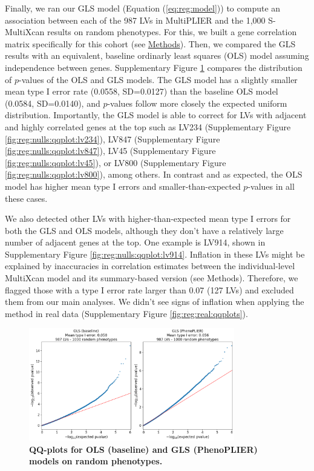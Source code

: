 \documentclass[
  a4paper,
]{article}
\newenvironment{fignos:tagged-figure}[1][]{
  \let\oldfigurename\figurename
  \renewcommand{\figurename}{Supplementary Figure}
}{
  \let\figurename\oldfigurename
}
\begin{document}
Finally, we ran our GLS model (Equation (\ref{eq:reg:model})) to compute an association between each of the 987 LVs in MultiPLIER and the 1,000 S-MultiXcan results on random phenotypes.
For this, we built a gene correlation matrix specifically for this cohort (see \protect\hyperlink{sec:methods:reg}{Methods}).
Then, we compared the GLS results with an equivalent, baseline ordinarly least squares (OLS) model assuming independence between genes.
Supplementary Figure \ref{fig:reg:nulls:qqplots} compares the distribution of \(p\)-values of the OLS and GLS models.
The GLS model has a slightly smaller mean type I error rate (0.0558, SD=0.0127) than the baseline OLS model (0.0584, SD=0.0140), and \(p\)-values follow more closely the expected uniform distribution.
Importantly, the GLS model is able to correct for LVs with adjacent and highly correlated genes at the top such as LV234 (Supplementary Figure \ref{fig:reg:nulls:qqplot:lv234}), LV847 (Supplementary Figure \ref{fig:reg:nulls:qqplot:lv847}), LV45 (Supplementary Figure \ref{fig:reg:nulls:qqplot:lv45}), or LV800 (Supplementary Figure \ref{fig:reg:nulls:qqplot:lv800}), among others.
In contrast and as expected, the OLS model has higher mean type I errors and smaller-than-expected \(p\)-values in all these cases.

We also detected other LVs with higher-than-expected mean type I errors for both the GLS and OLS models, although they don't have a relatively large number of adjacent genes at the top.
One example is LV914, shown in Supplementary Figure \ref{fig:reg:nulls:qqplot:lv914}.
Inflation in these LVs might be explained by inaccuracies in correlation estimates between the individual-level MultiXcan model and its summary-based version (see Methods).
Therefore, we flagged those with a type I error rate larger than 0.07 (127 LVs) and excluded them from our main analyses.
We didn't see signs of inflation when applying the method in real data (Supplementary Figure \ref{fig:reg:real:qqplots}).

\begin{fignos:tagged-figure}[S1]

\begin{figure}
\hypertarget{fig:reg:nulls:qqplots}{%
\centering
\includegraphics[width=0.8\textwidth,height=\textheight]{images/gls/null_sims/models_qqplots.png}
\caption{\textbf{QQ-plots for OLS (baseline) and GLS (PhenoPLIER) models on random phenotypes.}}\label{fig:reg:nulls:qqplots}
}
\end{figure}

\end{fignos:tagged-figure}
\end{document}
